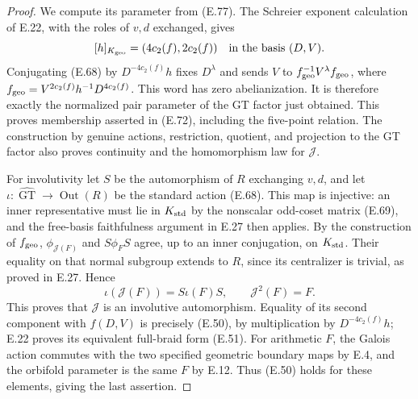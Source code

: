 \begin{proof}
We compute its parameter from (E.77).
The Schreier exponent calculation of E.22,
with the roles of $v,d$ exchanged, gives
\[
       [h]_{K_{\rm geo}}=(4c_2(f),2c_2(f))
                     \quad\text{in the basis }(D,V).
\]
Conjugating (E.68) by
$D^{-4c_2(f)}h$ fixes $D^\lambda$ and sends
$V$ to $f_{\rm geo}^{-1}V^\lambda f_{\rm geo}$,
where
$f_{\rm geo}=V^{2c_2(f)}h^{-1}D^{4c_2(f)}$.
This word has zero abelianization.  It is
therefore exactly the normalized pair
parameter of the GT factor just obtained.
This proves membership asserted in (E.72),
including the five-point relation.
The construction by genuine actions,
restriction, quotient, and projection to
the GT factor also proves continuity and
the homomorphism law for $\mathcal J$.

For involutivity let $S$ be the automorphism
of $R$ exchanging $v,d$, and let
$\iota:\widehat{\operatorname{GT}}\to
\operatorname{Out}(R)$ be the standard action
(E.68).
This map is injective: an inner representative
must lie in $K_{\rm std}$ by the nonscalar
odd-coset matrix (E.69), and the free-basis
faithfulness argument in E.27 then applies.
By the construction of $f_{\rm geo}$,
$\phi_{\mathcal J(F)}$ and
$S\phi_FS$ agree, up to an inner conjugation,
on $K_{\rm std}$.
Their equality on that normal subgroup
extends to $R$, since its centralizer is
trivial, as proved in E.27.
Hence
\[
       \iota(\mathcal J(F))=S\iota(F)S,
                  \qquad\mathcal J^2(F)=F.              \tag{E.78}
\]
This proves that $\mathcal J$ is an
involutive automorphism.
Equality of its second component with
$f(D,V)$ is precisely (E.50), by multiplication
by $D^{-4c_2(f)}h$; E.22 proves its equivalent
full-braid form (E.51).
For arithmetic $F$, the Galois action
commutes with the two specified geometric
boundary maps by E.4, and the orbifold
parameter is the same $F$ by E.12.
Thus (E.50) holds for these elements,
giving the last assertion.
\end{proof}
